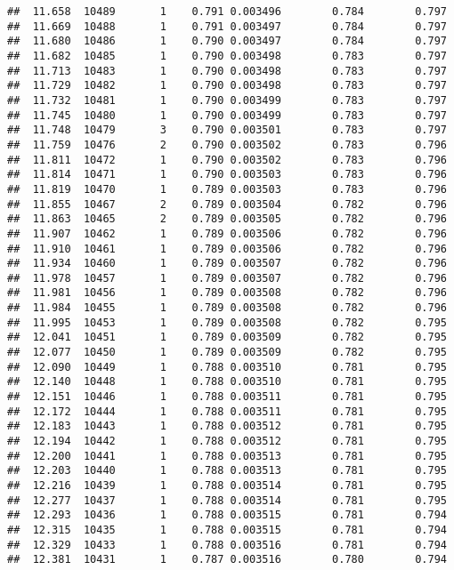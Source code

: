 \documentclass[
]{book}
\begin{document}
\begin{verbatim}
##  11.658  10489       1    0.791 0.003496        0.784        0.797
##  11.669  10488       1    0.791 0.003497        0.784        0.797
##  11.680  10486       1    0.790 0.003497        0.784        0.797
##  11.682  10485       1    0.790 0.003498        0.783        0.797
##  11.713  10483       1    0.790 0.003498        0.783        0.797
##  11.729  10482       1    0.790 0.003498        0.783        0.797
##  11.732  10481       1    0.790 0.003499        0.783        0.797
##  11.745  10480       1    0.790 0.003499        0.783        0.797
##  11.748  10479       3    0.790 0.003501        0.783        0.797
##  11.759  10476       2    0.790 0.003502        0.783        0.796
##  11.811  10472       1    0.790 0.003502        0.783        0.796
##  11.814  10471       1    0.790 0.003503        0.783        0.796
##  11.819  10470       1    0.789 0.003503        0.783        0.796
##  11.855  10467       2    0.789 0.003504        0.782        0.796
##  11.863  10465       2    0.789 0.003505        0.782        0.796
##  11.907  10462       1    0.789 0.003506        0.782        0.796
##  11.910  10461       1    0.789 0.003506        0.782        0.796
##  11.934  10460       1    0.789 0.003507        0.782        0.796
##  11.978  10457       1    0.789 0.003507        0.782        0.796
##  11.981  10456       1    0.789 0.003508        0.782        0.796
##  11.984  10455       1    0.789 0.003508        0.782        0.796
##  11.995  10453       1    0.789 0.003508        0.782        0.795
##  12.041  10451       1    0.789 0.003509        0.782        0.795
##  12.077  10450       1    0.789 0.003509        0.782        0.795
##  12.090  10449       1    0.788 0.003510        0.781        0.795
##  12.140  10448       1    0.788 0.003510        0.781        0.795
##  12.151  10446       1    0.788 0.003511        0.781        0.795
##  12.172  10444       1    0.788 0.003511        0.781        0.795
##  12.183  10443       1    0.788 0.003512        0.781        0.795
##  12.194  10442       1    0.788 0.003512        0.781        0.795
##  12.200  10441       1    0.788 0.003513        0.781        0.795
##  12.203  10440       1    0.788 0.003513        0.781        0.795
##  12.216  10439       1    0.788 0.003514        0.781        0.795
##  12.277  10437       1    0.788 0.003514        0.781        0.795
##  12.293  10436       1    0.788 0.003515        0.781        0.794
##  12.315  10435       1    0.788 0.003515        0.781        0.794
##  12.329  10433       1    0.788 0.003516        0.781        0.794
##  12.381  10431       1    0.787 0.003516        0.780        0.794

\end{verbatim}
\end{document}
